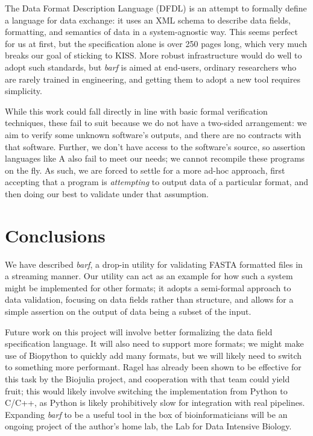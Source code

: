 \documentclass[12pt]{article} %
\begin{document}
The Data Format Description Language (DFDL) \citep{michael_j_beckerle_data_2014}
is an attempt to formally define a language for data exchange: it uses an XML
schema to describe data fields, formatting, and semantics of data in a system-agnostic
way. This seems perfect for us at first, but the specification alone is over 250 pages
long, which very much breaks our goal of sticking to KISS. More robust infrastructure
would do well to adopt such standards, but \emph{barf} is aimed at end-users,
ordinary researchers who are rarely trained in engineering, and getting them to adopt
a new tool requires simplicity.

While this work could fall directly in line with basic formal verification techniques, these
fail to suit because we do not have a two-sided arrangement: we aim to verify some
unknown software's outputs, and there are no contracts with that software. Further,
we don't have access to the software's source, so assertion languages like 
A \citep{tjang_:_2006} also fail to meet our needs; we cannot recompile these
programs on the fly. As such, we are forced to settle for a more ad-hoc approach,
first accepting that a program is \emph{attempting} to output data of a particular
format, and then doing our best to validate under that assumption.

\section{Conclusions}

We have described \emph{barf}, a drop-in utility for validating FASTA formatted files
in a streaming manner. Our utility can act as an example for how such a system might
be implemented for other formats; it adopts a semi-formal approach to data validation,
focusing on data fields rather than structure, and allows for a simple assertion on
the output of data being a subset of the input. 

Future work on this project will involve better formalizing the data field specification 
language. It will also need to support more formats; we might make use of Biopython
\citep{cock_biopython:_2009} to quickly add many formats, but we will likely
need to switch to something more performant. Ragel \citep{_ragel_2014} has already
been shown to be effective for this task by the Biojulia \cite{_bio.jl_2016} project,
and cooperation with that team could yield fruit; this would likely involve
switching the implementation from Python to C/C++, as Python is likely prohibitively
slow for integration with real pipelines. Expanding \emph{barf} to be a useful tool
in the box of bioinformaticians will be an ongoing project of the author's home lab,
the Lab for Data Intensive Biology.



\end{document}

